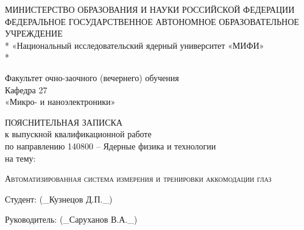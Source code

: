 \begin{titlepage}
\newpage

\begin{center}
МИНИСТЕРСТВО ОБРАЗОВАНИЯ И НАУКИ РОССИЙСКОЙ ФЕДЕРАЦИИ 
ФЕДЕРАЛЬНОЕ ГОСУДАРСТВЕННОЕ АВТОНОМНОЕ ОБРАЗОВАТЕЛЬНОЕ 
УЧРЕЖДЕНИЕ \\*
\vspace{1em}
«Национальный исследовательский ядерный университет «МИФИ»\\*
\hrulefill
\end{center}

\vspace{0.5em}

\begin{center}
 
Факультет очно-заочного (вечернего) обучения\\
Кафедра 27\\
«Микро- и наноэлектроники»\\
\end{center}

\vspace{0.5em}

\begin{center}
ПОЯСНИТЕЛЬНАЯ ЗАПИСКА\\
к выпускной квалификационной работе\\
по направлению 140800 – Ядерные физика и технологии\\
на тему:
\end{center}

\vspace{0.5em}

 
\begin{center}
\textsc{Автоматизированная система измерения и тренировки аккомодации глаз}
\end{center}

\vspace{1em}
 
\begin{center}

Студент:\hspace{3.45cm} \underline{\hspace{6cm}} \hspace{\fill}(\_Кузнецов Д.П.\_)\\ 
\vspace{1em}
 
Руководитель:\hspace{2.2cm} \underline{\hspace{6cm}} \hspace{\fill}(\_Саруханов В.А.\_)\\  
\vspace{1em}
 

\end{center}
\end{titlepage}
